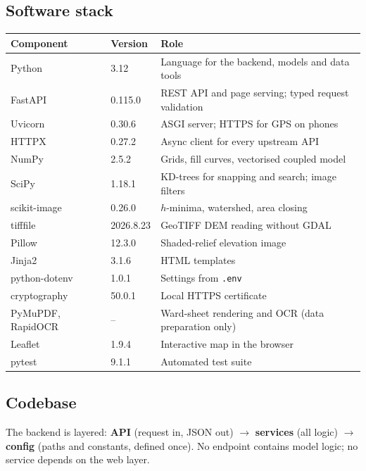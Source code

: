 \documentclass[11pt,a4paper]{article}
\begin{document}
\subsection{Software stack}

{\small
\begin{longtable}{@{}p{3.2cm}p{2.0cm}p{9.5cm}@{}}
\toprule
\textbf{Component} & \textbf{Version} & \textbf{Role}\\
\midrule\endhead
Python & 3.12 & Language for the backend, models and data tools\\
FastAPI & 0.115.0 & REST API and page serving; typed request validation\\
Uvicorn & 0.30.6 & ASGI server; HTTPS for GPS on phones\\
HTTPX & 0.27.2 & Async client for every upstream API\\
NumPy & 2.5.2 & Grids, fill curves, vectorised coupled model\\
SciPy & 1.18.1 & KD-trees for snapping and search; image filters\\
scikit-image & 0.26.0 & $h$-minima, watershed, area closing\\
tifffile & 2026.8.23 & GeoTIFF DEM reading without GDAL\\
Pillow & 12.3.0 & Shaded-relief elevation image\\
Jinja2 & 3.1.6 & HTML templates\\
python-dotenv & 1.0.1 & Settings from \texttt{.env}\\
cryptography & 50.0.1 & Local HTTPS certificate\\
PyMuPDF, RapidOCR & -- & Ward-sheet rendering and OCR (data preparation only)\\
Leaflet & 1.9.4 & Interactive map in the browser\\
pytest & 9.1.1 & Automated test suite\\
\bottomrule
\end{longtable}}

\subsection{Codebase}

The backend is layered: \textbf{API} (request in, JSON out) $\rightarrow$
\textbf{services} (all logic) $\rightarrow$ \textbf{config} (paths and constants,
defined once). No endpoint contains model logic; no service depends on the web layer.
\end{document}
